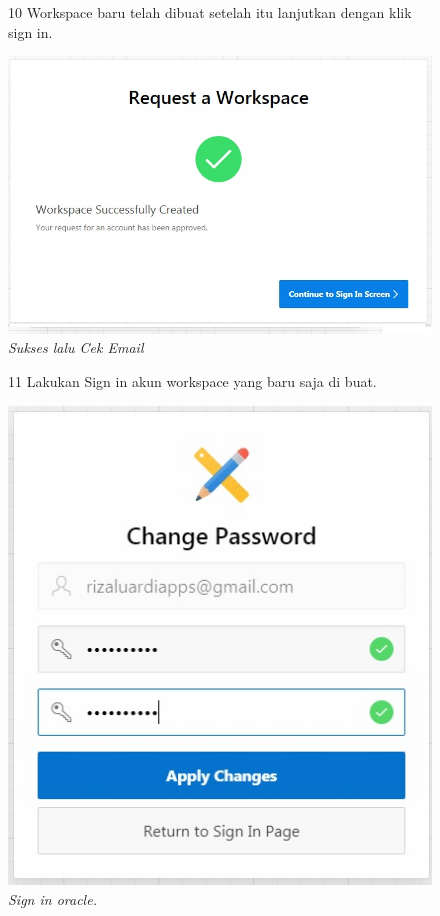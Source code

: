 \begin{enumerate}
\begin{figure}
\item[10] Workspace baru telah dibuat setelah itu lanjutkan dengan klik sign in.

    \begin{center}
\includegraphics[scale=0.5]{figures/pict(5).jpg}
    \caption{\textit{Sukses lalu Cek Email}}
        \end{center}
\label{gambar}
\end{figure}

\begin{figure}
\item[11] Lakukan Sign in akun workspace yang baru saja di buat.

    \begin{center}
\includegraphics[scale=0.5]{figures/pict(6).jpg}
    \caption{\textit{Sign in oracle.}}
        \end{center}
\label{gambar}
\end{figure}


\end{enumerate}
